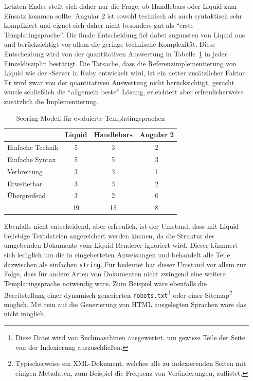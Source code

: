 Letzten Endes stellt sich daher nur die Frage, ob Handlebars oder Liquid zum Einsatz kommen sollte: Angular 2 ist sowohl technisch als auch syntaktisch sehr kompliziert und eignet sich daher nicht besonders gut als "`erste Templatingsprache"'. Die finale Entscheidung fiel dabei zugunsten von Liquid aus und berücksichtigt vor allem die geringe technische Komplexität. Diese Entscheidung wird von der quantitativen Auswertung in Tabelle~\ref{tab:scoring-templating-language} in jeder Einzeldisziplin bestätigt. Die Tatsache, dass die Referenzimplementierung von Liquid wie der \idename{}-Server in Ruby entwickelt wird, ist ein netter zusätzlicher Faktor. Er wird zwar von der quantitativen Auswertung nicht berücksichtigt, gesucht wurde schließlich die "`allgemein beste"' Lösung, erleichtert aber erfreulicherweise zusätzlich die Implementierung.

\begin{table}[h]
  \centering
  \begin{tabular}{ l c c c }
                      & Liquid   & Handlebars      & Angular 2   \\
    \hline
    Einfache Technik  & 5        & 3               & 2           \\
    Einfache Syntax   & 5        & 5               & 3           \\
    Verbreitung       & 3        & 3               & 1           \\
    Erweiterbar       & 3        & 3               & 2           \\
    Übergreifend      & 3        & 2               & 0           \\
    \hline \hline
                      & 19       & 15              & 8
  \end{tabular}
  \caption{Scoring-Modell für evaluierte Templatingsprachen}
  \label{tab:scoring-templating-language}
\end{table}

Ebenfalls nicht entscheidend, aber erfreulich, ist der Umstand, dass mit Liquid beliebige Textdateien angereichert werden können, da die Struktur des umgebenden Dokuments vom Liquid-Renderer ignoriert wird. Dieser kümmert sich lediglich um die in eingebetteten Anweisungen und behandelt alle Teile dazwischen als einfachen \texttt{string}. Für \idename{} bedeutet hat dieser Umstand vor allem zur Folge, dass für andere Arten von Dokumenten nicht zwingend eine weitere Templatingsprache notwendig wäre. Zum Beispiel wäre ebenfalls die Bereitstellung einer dynamisch generierten \texttt{robots.txt}\footnote{Diese Datei wird von Suchmaschinen ausgewertet, um gewisse Teile der Seite von der Indexierung auszuschließen.} oder einer Sitemap\footnote{Typischerweise ein XML-Dokument, welches alle zu indexierenden Seiten mit einigen Metadaten, zum Beispiel die Frequenz von Veränderungen, auflistet.} möglich. Mit rein auf die Generierung von HTML ausgelegten Sprachen wäre das nicht möglich.

